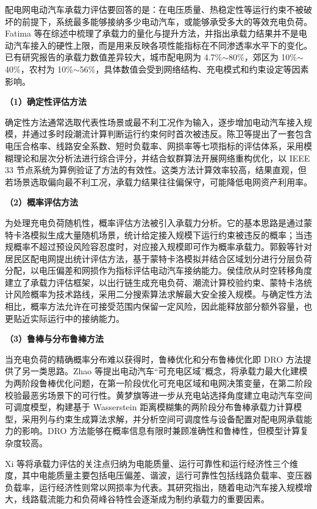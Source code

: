 \documentclass[10pt,a4paper]{article}
\numberwithin{equation}{section}
\numberwithin{table}{section}
\numberwithin{figure}{section}
\begin{document}
    配电网电动汽车承载力评估要回答的是：在电压质量、热稳定性等运行约束不被破坏的前提下，系统最多能够接纳多少电动汽车，或能够承受多大的等效充电负荷。Fatima 等\supercite{ref6}在综述中梳理了承载力的量化与提升方法，并指出承载力结果并不是电动汽车接入的硬性上限，而是用来反映各项性能指标在不同渗透率水平下的变化。已有研究报告的承载力数值差异较大，城市配电网为 4.7\%$\sim$80\%，郊区为 10\%$\sim$40\%，农村为 10\%$\sim$56\%，具体数值会受到网络结构、充电模式和约束设定等因素影响。

    \noindent\textbf{（1）确定性评估方法}

    确定性方法通常选取代表性场景或最不利工况作为输入，逐步增加电动汽车接入规模，并通过多时段潮流计算判断运行约束何时首次被违反。陈卫等\supercite{ref13}提出了一套包含电压合格率、线路安全系数、短时负载率、网损率等七项指标的评估体系，采用模糊理论和层次分析法进行综合评分，并结合蚁群算法开展网络重构优化，以 IEEE 33 节点系统为算例验证了方法的有效性。这类方法计算效率较高，结果直观，但若场景选取偏向最不利工况，承载力结果往往偏保守，可能降低电网资产利用率。

    \noindent\textbf{（2）概率评估方法}

    为处理充电负荷随机性，概率评估方法被引入承载力分析。它的基本思路是通过蒙特卡洛模拟生成大量随机场景，统计给定接入规模下运行约束被违反的概率；当违规概率不超过预设风险容忍度时，对应接入规模即可作为概率承载力。郭毅等\supercite{ref14}针对居民区配电网提出统计评估方法，基于蒙特卡洛模拟并结合区域划分进行分层负荷分配，以电压偏差和网损作为指标评估电动汽车接纳能力。侯佳欣\supercite{ref15}从时空转移角度建立了承载力评估框架，以出行链生成充电负荷、潮流计算校验约束、蒙特卡洛统计风险概率为技术路线，采用二分搜索算法求解最大安全接入规模。与确定性方法相比，概率方法允许在可接受范围内保留一定风险，因此能释放部分额外容量，也更贴近实际运行中的接纳能力。

    \noindent\textbf{（3）鲁棒与分布鲁棒方法}

    当充电负荷的精确概率分布难以获得时，鲁棒优化和分布鲁棒优化即 DRO 方法提供了另一类思路。Zhao 等\supercite{ref16}提出电动汽车“可充电区域”概念，将承载力最大化建模为两阶段鲁棒优化问题，在第一阶段优化可充电区域和电网决策变量，在第二阶段校验最恶劣场景下的可行性。黄梦旗等\supercite{ref17}进一步从充电站选择角度建立电动汽车空间可调度模型，构建基于 Wasserstein 距离模糊集的两阶段分布鲁棒承载力计算模型，采用列与约束生成算法求解，并分析空间可调度性与设备配置对配电网承载能力的影响。DRO 方法能够在概率信息有限时兼顾准确性和鲁棒性，但模型计算复杂度较高。

    Xi 等\supercite{ref18}将承载力评估的关注点归纳为电能质量、运行可靠性和运行经济性三个维度，其中电能质量主要包括电压偏差、谐波，运行可靠性包括线路负载率、变压器负载率，运行经济性则常以网损率为代表。其研究指出，随着电动汽车接入规模增大，线路载流能力和负荷峰谷特性会逐渐成为制约承载力的重要因素。
\end{document}
